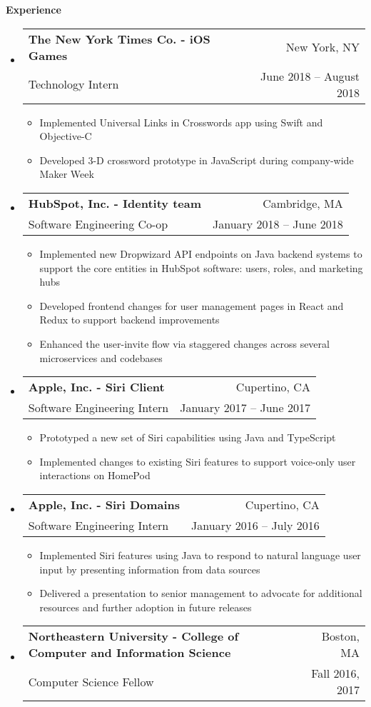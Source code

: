 \documentclass[letterpaper,10pt]{article}
\makeatletter
\newcommand{\resitem}[1]{\item #1 \vspace{-2pt}}
\newcommand{\resheading}[1]{{\large \colorbox{mygrey}{\begin{minipage}{\textwidth}{\textbf{#1 \vphantom{p\^{E}}}}\end{minipage}}}}
\newcommand{\ressubheading}[4]{
\begin{tabular*}{6.8in}{l@{\extracolsep{\fill}}r}
		\textbf{#1} & #2 \\
		\small{#3} & \small{#4} \\
\end{tabular*}\vspace{-6pt}}
\makeatother
\begin{document}
\resheading{Experience}
\begin{itemize}[leftmargin=*]
  \item[]
  \ressubheading{The New York Times Co. - \small{iOS Games}}{New York, NY}{Technology Intern}{June 2018 -- August 2018}
  {\footnotesize
    \begin{itemize}
	  \resitem{Implemented Universal Links in Crosswords app using Swift and Objective-C}
	  \resitem{Developed 3-D crossword prototype in JavaScript during company-wide Maker Week}
  \end{itemize}}
  \item[]
  \ressubheading{HubSpot, Inc. - \small{Identity team}}{Cambridge, MA}{Software Engineering Co-op}{January 2018 -- June 2018}
  {\footnotesize
    \begin{itemize}
      \resitem{Implemented new Dropwizard API endpoints on Java backend systems to support the core entities in HubSpot software: users, roles, and marketing hubs}
      \resitem{Developed frontend changes for user management pages in React and Redux to support backend improvements}
      \resitem{Enhanced the user-invite flow via staggered changes across several microservices and codebases}
  \end{itemize}}
	\item[]
	\ressubheading{Apple, Inc. - \small{Siri Client}}{Cupertino, CA}{Software Engineering Intern}{January 2017 -- June 2017}
	{\footnotesize
		\begin{itemize}
			\resitem{Prototyped a new set of Siri capabilities using Java and TypeScript}
			\resitem{Implemented changes to existing Siri features to support voice-only user interactions on HomePod}
	\end{itemize}}
	\item[]
	\ressubheading{Apple, Inc. - \small{Siri Domains}}{Cupertino, CA}{Software Engineering Intern}{January 2016 -- July 2016}
	{\footnotesize
		\begin{itemize}
			\resitem{Implemented Siri features using Java to respond to natural language user input by presenting information from data sources}
			\resitem{Delivered a presentation to senior management to advocate for additional resources and further adoption in future releases}
	\end{itemize}}
	\item[]
	\ressubheading{Northeastern University - \small{College of Computer and Information Science}}{Boston, MA}{Computer Science Fellow}{Fall 2016, 2017}
	{\footnotesize
		\begin{itemize}

\end{itemize}}
\end{itemize}
\end{document}
